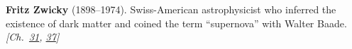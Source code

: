 \textbf{Fritz Zwicky} (1898–1974). Swiss-American astrophysicist who inferred the existence of dark matter and coined the term ``supernova'' with Walter Baade. \emph{[Ch.~\hyperref[ch:osmosisdebye]{31}, \hyperref[ch:darkmatterevidence]{37}]}


